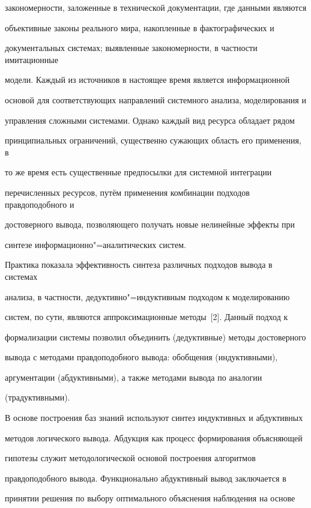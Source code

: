закономерности, заложенные в технической документации, где данными являются

объективные законы реального мира, накопленные в фактографических и

документальных системах; выявленные закономерности, в частности имитационные

модели. Каждый из источников в настоящее время является информационной

основой для соответствующих направлений системного анализа, моделирования и

управления сложными системами. Однако каждый вид ресурса обладает рядом

принципиальных ограничений, существенно сужающих область его применения, в

то же время есть существенные предпосылки для системной интеграции

перечисленных ресурсов, путём применения комбинации подходов правдоподобного и

достоверного вывода, позволяющего получать новые нелинейные эффекты при

синтезе информационно"=аналитических систем.



Практика показала эффективность синтеза различных подходов вывода в системах

анализа, в частности, дедуктивно"=индуктивным подходом к моделированию

систем, по сути, являются аппроксимационные методы~[2]. Данный подход к

формализации системы позволил объединить (дедуктивные) методы достоверного

вывода с методами правдоподобного вывода: обобщения (индуктивными),

аргументации (абдуктивными), а также методами вывода по аналогии

(традуктивными).



В основе построения баз знаний используют синтез индуктивных и абдуктивных

методов логического вывода. Абдукция как процесс формирования объясняющей

гипотезы служит методологической основой построения алгоритмов

правдоподобного вывода. Функционально абдуктивный вывод заключается в

принятии решения по выбору оптимального объяснения наблюдения на основе

